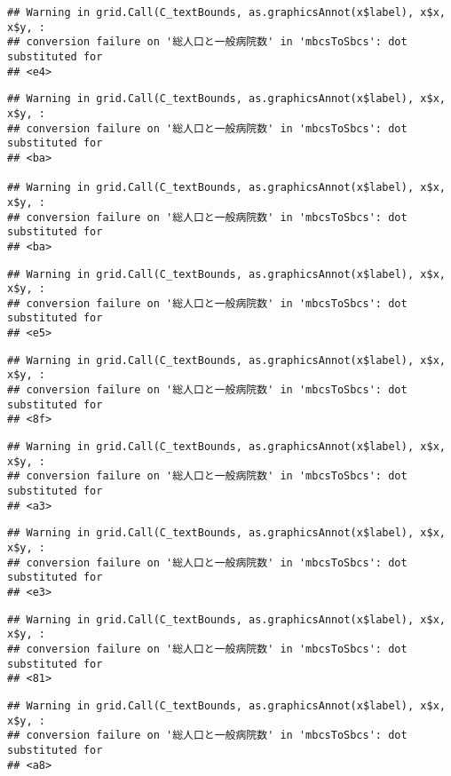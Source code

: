 \documentclass[
]{article}
\begin{document}
\begin{verbatim}
## Warning in grid.Call(C_textBounds, as.graphicsAnnot(x$label), x$x, x$y, :
## conversion failure on '総人口と一般病院数' in 'mbcsToSbcs': dot substituted for
## <e4>
\end{verbatim}

\begin{verbatim}
## Warning in grid.Call(C_textBounds, as.graphicsAnnot(x$label), x$x, x$y, :
## conversion failure on '総人口と一般病院数' in 'mbcsToSbcs': dot substituted for
## <ba>

## Warning in grid.Call(C_textBounds, as.graphicsAnnot(x$label), x$x, x$y, :
## conversion failure on '総人口と一般病院数' in 'mbcsToSbcs': dot substituted for
## <ba>
\end{verbatim}

\begin{verbatim}
## Warning in grid.Call(C_textBounds, as.graphicsAnnot(x$label), x$x, x$y, :
## conversion failure on '総人口と一般病院数' in 'mbcsToSbcs': dot substituted for
## <e5>
\end{verbatim}

\begin{verbatim}
## Warning in grid.Call(C_textBounds, as.graphicsAnnot(x$label), x$x, x$y, :
## conversion failure on '総人口と一般病院数' in 'mbcsToSbcs': dot substituted for
## <8f>
\end{verbatim}

\begin{verbatim}
## Warning in grid.Call(C_textBounds, as.graphicsAnnot(x$label), x$x, x$y, :
## conversion failure on '総人口と一般病院数' in 'mbcsToSbcs': dot substituted for
## <a3>
\end{verbatim}

\begin{verbatim}
## Warning in grid.Call(C_textBounds, as.graphicsAnnot(x$label), x$x, x$y, :
## conversion failure on '総人口と一般病院数' in 'mbcsToSbcs': dot substituted for
## <e3>
\end{verbatim}

\begin{verbatim}
## Warning in grid.Call(C_textBounds, as.graphicsAnnot(x$label), x$x, x$y, :
## conversion failure on '総人口と一般病院数' in 'mbcsToSbcs': dot substituted for
## <81>
\end{verbatim}

\begin{verbatim}
## Warning in grid.Call(C_textBounds, as.graphicsAnnot(x$label), x$x, x$y, :
## conversion failure on '総人口と一般病院数' in 'mbcsToSbcs': dot substituted for
## <a8>
\end{verbatim}
\end{document}
